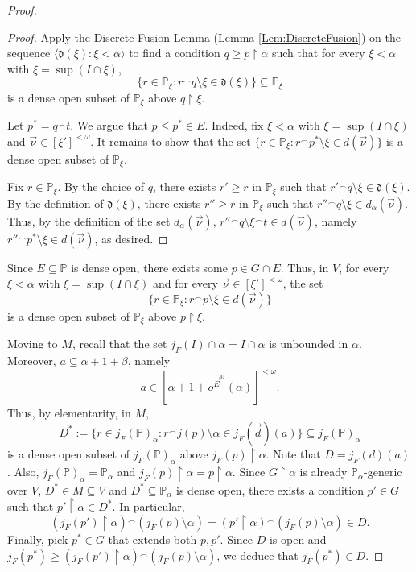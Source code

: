 \documentclass[10pt,a4paper]{amsart}
\newcommand{\la}{\langle}
\newcommand{\po}{\mathbb{P}}
\newcommand{\ra}{\rangle}
\newcommand{\uhr}{\upharpoonright}
\begin{document}
\begin{proof}
\begin{proof}
        Apply the Discrete Fusion Lemma (Lemma \ref{Lem:DiscreteFusion}) on the sequence $\la \mathfrak{d}(\xi) \colon \xi<\alpha \ra$ to find a condition $q\geq p\uhr \alpha$ such that for every $\xi<\alpha$ with $\xi = \sup(I\cap \xi)$,
        $$ \{ r\in \po_\xi \colon r{}^\frown q\setminus \xi \in \mathfrak{d}(\xi) \}\subseteq \po_\xi $$
        is a dense open subset of $\po_\xi$ above $q\uhr \xi$. 
        
        Let $p^* = q{}^\frown t$. We argue that $p\leq p^*\in E$. Indeed, fix $\xi<\alpha$ with $\xi =\sup(I\cap \xi)$ and $\vec{\nu}\in [\xi']^{<\omega}$. It remains to show that the set $\{r\in \po_\xi \colon r{}^\frown p^*\setminus \xi \in d(\vec{\nu}) \}$ is a dense open subset of $\po_\xi$. 
        
        Fix $r\in \po_\xi$. By the choice of $q$, there exists $r'\geq r$ in $\po_\xi$ such that $r'{}^\frown q\setminus \xi\in \mathfrak{d}(\xi)$. By the definition of $\mathfrak{d}(\xi)$, there exists $r''\geq r$ in $\po_\xi$ such that ${r''}{}^\frown q\setminus \xi\in d_\alpha(\vec{\nu})$. Thus, by the definition of the set $d_\alpha(\vec{\nu})$, ${r''}{}^\frown q\setminus \xi{}^\frown t\in d(\vec{\nu})$, namely ${r''}{}^\frown p^*\setminus \xi \in d(\vec{\nu})$, as desired.
        \end{proof}
        Since $E\subseteq \po$ is dense open, there exists some $p\in G\cap E$. Thus, in $V$, for every $\xi<\alpha$ with $\xi = \sup(I\cap \xi)$ and for every $\vec{\nu}\in [\xi' ]^{<\omega}$, the set
        $$ \{  r\in \po_\xi \colon r{}^\frown p\setminus \xi\in d(\vec{\nu}) \} $$
        is a dense open subset of $\po_\xi$ above $p\uhr \xi$. 

        Moving to $M$, recall that the set  $j_F(I)\cap\alpha=I\cap\alpha$ is unbounded in $\alpha$.   Moreover, $a\subseteq \alpha+1+\beta$, namely 
        $$a\in\left[ \alpha+1+o^{{\vec{E}}^M}(\alpha)\right]^{<\omega}.$$
        Thus, by elementarity, in $M$,
        $$D^* := \{ r\in j_F(\po)_\alpha \colon r{}^\frown j(p)\setminus \alpha \in j_F(\vec{d})(a) \}\subseteq j_F(\po)_\alpha $$
        is a dense open subset of $j_F(\po)_\alpha$ above $j_F(p)\uhr \alpha$. Note that $D = j_F(d)(a)$. Also, $j_F(\po)_\alpha = \po_\alpha$ and $j_F(p)\uhr \alpha = p\uhr \alpha$. Since $G\uhr \alpha$ is already $\po_\alpha$-generic over $V$, $D^*\in M\subseteq V$ and $D^*\subseteq \po_\alpha$ is dense open, there exists a condition $p'\in G$ such that $p'\uhr \alpha\in D^*$. In particular, 
        $$ (j_F(p')\uhr \alpha){}^\frown (j_F(p)\setminus \alpha) = (p'\uhr \alpha){}^\frown (j_F(p)\setminus \alpha)  \in D. $$
        Finally, pick $p^*\in G$ that extends both $p, p'$. Since $D$ is open and $j_F(p^*)\geq (j_F(p')\uhr \alpha){}^\frown (j_F(p)\setminus \alpha)$, we deduce that $j_F(p^*)\in D$. 
    \end{proof}
\end{document}
